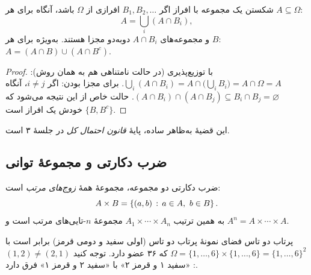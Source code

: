 \begin{figblock}

\end{figblock}

\begin{theorem}[label=thm:partition-decomp]{شکستن یک مجموعه با افراز}
اگر $B_1,B_2,\dots$ افرازی از $\Omega$ باشد، آنگاه برای هر $A\subseteq\Omega$:
\[
A=\bigcup_i (A\cap B_i),
\]
و مجموعه‌های $A\cap B_i$ دوبه‌دو مجزا هستند. به‌ویژه برای هر $B$: \ $A=(A\cap B)\cup(A\cap B^c)$.
\end{theorem}

\begin{proof}
با توزیع‌پذیری (در حالت نامتناهی هم به همان روش): $\bigcup_i(A\cap B_i)=A\cap\bigl(\bigcup_i B_i\bigr)=A\cap\Omega=A$.
برای مجزا بودن: اگر $i\ne j$، آنگاه $(A\cap B_i)\cap(A\cap B_j)\subseteq B_i\cap B_j=\varnothing$.
حالت خاص از این نتیجه می‌شود که $\{B,B^c\}$ خودش یک افراز است.
\end{proof}

این قضیهٔ به‌ظاهر ساده، پایهٔ \emph{قانون احتمال کل} در جلسهٔ ۳ است.

\subsection{ضرب دکارتی و مجموعهٔ توانی}

\begin{definition}{ضرب دکارتی}
 دو مجموعه، مجموعهٔ همهٔ \emph{زوج‌های مرتب} است:
\[ A\times B=\left\{(a,b) \,:\, a\in A,\ b\in B\right\}. \]
به همین ترتیب $A_1\times\cdots\times A_n$ مجموعهٔ $n$-تایی‌های مرتب است و $A^n=A\times\cdots\times A$.
\end{definition}

\begin{example}{پرتاب دو تاس}
فضای نمونهٔ پرتاب دو تاس (اولی سفید و دومی قرمز) برابر است با
$\Omega=\{1,\dots,6\}\times\{1,\dots,6\}=\{1,\dots,6\}^2$ که ۳۶ عضو دارد. توجه کنید $(1,2)\ne(2,1)$: «سفید ۱ و قرمز ۲» با «سفید ۲ و قرمز ۱» فرق دارد.
\end{example}

